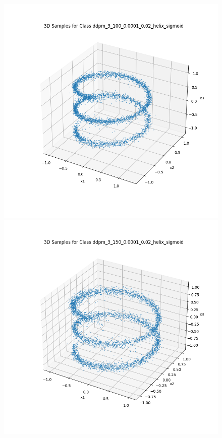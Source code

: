 \documentclass[a4paper,12pt]{article}
\begin{document}
\begin{figure}[h]
  \begin{minipage}{0.3\textwidth}
      \centering
      \includegraphics[width=\linewidth]{"images/Samples for ddpm_3_100_0.0001_0.02_helix_sigmoid.png"}
  \end{minipage}
  \begin{minipage}{0.3\textwidth}
      \centering
      \includegraphics[width=\linewidth]{"images/Samples for ddpm_3_150_0.0001_0.02_helix_sigmoid.png"}

\end{minipage}
\end{figure}
\end{document}

